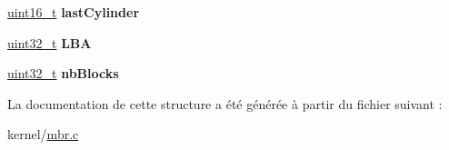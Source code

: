 \begin{DoxyCompactItemize}
\item 
\hypertarget{struct__PartitionDescriptor_ae41ef6da9ade744a36f58a1e5ece36f7}{\hyperlink{types_8h_adf4d876453337156dde61095e1f20223}{uint16\-\_\-t} {\bfseries last\-Cylinder}}\label{struct__PartitionDescriptor_ae41ef6da9ade744a36f58a1e5ece36f7}

\item 
\hypertarget{struct__PartitionDescriptor_ae0a54b137da361739f30ce3a33f46379}{\hyperlink{types_8h_a33594304e786b158f3fb30289278f5af}{uint32\-\_\-t} {\bfseries \-L\-B\-A}}\label{struct__PartitionDescriptor_ae0a54b137da361739f30ce3a33f46379}

\item 
\hypertarget{struct__PartitionDescriptor_a48615506f84f0b810db3d15fbcbbfe2f}{\hyperlink{types_8h_a33594304e786b158f3fb30289278f5af}{uint32\-\_\-t} {\bfseries nb\-Blocks}}\label{struct__PartitionDescriptor_a48615506f84f0b810db3d15fbcbbfe2f}

\end{DoxyCompactItemize}


\-La documentation de cette structure a été générée à partir du fichier suivant \-:\begin{DoxyCompactItemize}
\item 
kernel/\hyperlink{mbr_8c}{mbr.\-c}\end{DoxyCompactItemize}
